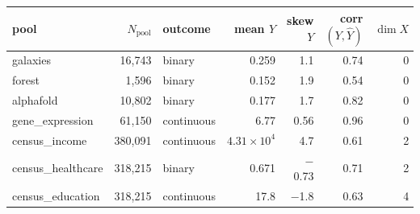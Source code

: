 \small\begin{tabular}{lrlrrrr}
\toprule
pool & $N_{\mathrm{pool}}$ & outcome & mean $Y$ & skew $Y$ & corr$(Y,\hat Y)$ & $\dim X$ \\
\midrule
galaxies & 16{,}743 & binary & 0.259 & 1.1 & 0.74 & 0 \\
forest & 1{,}596 & binary & 0.152 & 1.9 & 0.54 & 0 \\
alphafold & 10{,}802 & binary & 0.177 & 1.7 & 0.82 & 0 \\
gene\_expression & 61{,}150 & continuous & 6.77 & 0.56 & 0.96 & 0 \\
census\_income & 380{,}091 & continuous & $4.31{\times}10^{4}$ & 4.7 & 0.61 & 2 \\
census\_healthcare & 318{,}215 & binary & 0.671 & $-$0.73 & 0.71 & 2 \\
census\_education & 318{,}215 & continuous & 17.8 & $-$1.8 & 0.63 & 4 \\
\bottomrule
\end{tabular}
